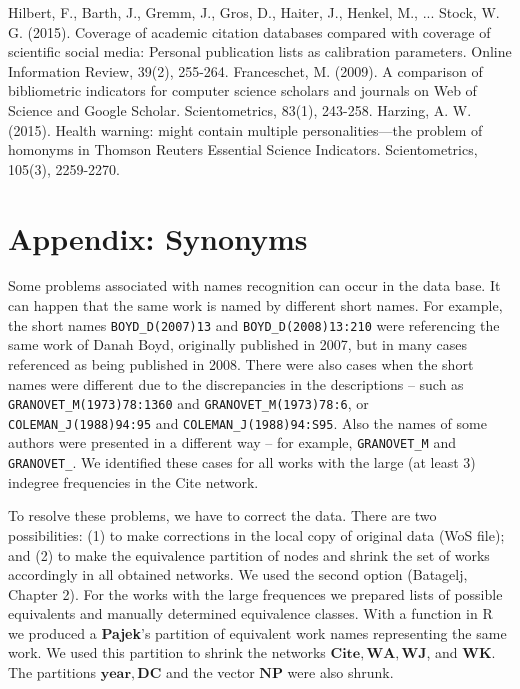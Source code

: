 \documentclass[11pt]{article} %
\begin{document}
\begin{thebibliography}{99}
Hilbert, F., Barth, J., Gremm, J., Gros, D., Haiter, J., Henkel, M., ... Stock, W. G. (2015). Coverage of academic citation databases compared with coverage of scientific social media: Personal publication lists as calibration parameters. Online Information Review, 39(2), 255-264.
Franceschet, M. (2009). A comparison of bibliometric indicators for computer science scholars and journals on Web of Science and Google Scholar. Scientometrics, 83(1), 243-258.
Harzing, A. W. (2015). Health warning: might contain multiple personalities—the problem of homonyms in Thomson Reuters Essential Science Indicators. Scientometrics, 105(3), 2259-2270.
\end{thebibliography}   


\appendix
\section{Appendix: Synonyms}

Some problems associated with names recognition can occur in the data base. It can happen that the same work is named by different short names. For example, the short names \texttt {BOYD\_D(2007)13} and \texttt {BOYD\_D(2008)13:210} were referencing the same work of Danah Boyd, originally published in 2007, but in many cases referenced as being published in 2008. There were also cases when the short names were different due to the discrepancies in the descriptions -- such as \texttt{GRANOVET\_M(1973)78:1360} and \texttt{GRANOVET\_M(1973)78:6}, or \texttt{COLEMAN\_J(1988)94:95} and \texttt{COLEMAN\_J(1988)94:S95}. Also the names of some authors were presented in a different way -- for example, \texttt{GRANOVET\_M} and \texttt{GRANOVET\_}. We identified these cases for all works with the large (at least 3) indegree frequencies in the Cite network.\medskip 

To resolve these problems, we have to correct the data. There are two possibilities: (1) to make corrections in the local copy of original data (WoS file); and (2) to make the equivalence partition of nodes and shrink the set of works accordingly in all  obtained networks. We used the second option (Batagelj, Chapter 2). For the works with the large frequences we prepared lists of possible equivalents and manually determined equivalence classes. With a function in R we produced a \textbf{Pajek}'s partition of equivalent work names representing the same work. We used this partition to shrink the networks $\mathbf{Cite, WA, WJ}$, and $\mathbf{WK}$. The partitions $\mathbf{year,  DC}$ and the vector $\mathbf{NP}$ were also shrunk.  \medskip 
\end{document}
